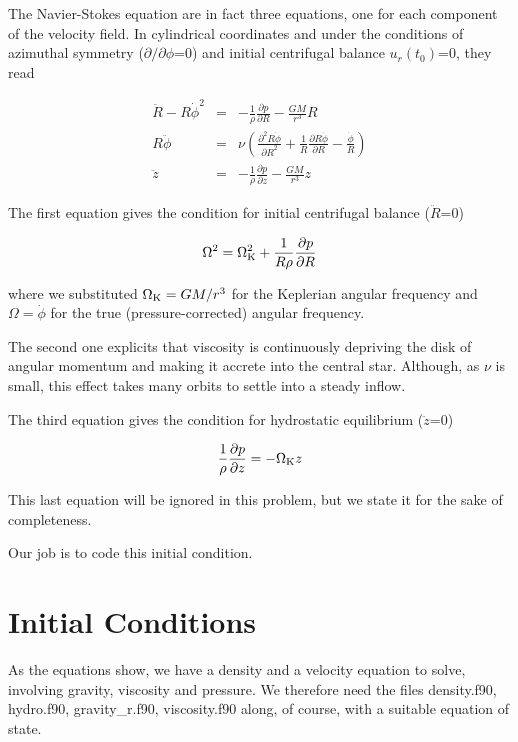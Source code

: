 \documentclass[a4paper,10pt]{article}
\newcommand{\pderiv}[2]{\frac{\partial #1}{\partial #2}}
\newcommand{\pderivn}[3]{\frac{{\partial{}}^{#3} #1}{{\partial #2}^{#3}}}
\begin{document}
The Navier-Stokes equation are in fact three equations, one for each component of the velocity field. In cylindrical coordinates and under the conditions of azimuthal symmetry ($\partial /{\partial}\phi$=0) and initial centrifugal balance $u_{r}(t_0)$=0, they read

\begin{eqnarray}
\ddot{R} - R{\dot{\phi}}^2 &=&  -\frac{1}{\rho}\pderiv{p}{R} - \frac{GM}{r^3}R\\ 
R\ddot{\phi}  &=&  \nu \left(\pderivn{R\dot\phi}{R}{2} + \frac{1}{R}\pderiv{R\dot{\phi}}{R} - \frac{\dot\phi}{R} \right)\\
\ddot{z}  &=& -\frac{1}{\rho}\pderiv{p}{z} - \frac{GM}{r^3}z 
\end{eqnarray}

The first equation gives the condition for initial centrifugal balance ($\ddot{R}$=0)

\begin{equation}
  \label{centrifugal}
  \Omega^2 = \Omega_{\rm K}^2 + \frac{1}{R\rho}\pderiv{p}{R} 
\end{equation}

\noindent where we substituted $\Omega_{\rm K}=GM/r^3$ for the Keplerian angular frequency and $\Omega=\dot\phi$ for the true (pressure-corrected) angular frequency.

The second one explicits that viscosity is continuously depriving the disk
of angular momentum and making it accrete into the central star.
Although, as $\nu$ is small, this effect takes many orbits to settle into a steady inflow. 

The third equation gives the condition for hydrostatic equilibrium ($\ddot{z}$=0)

\begin{equation}
  \frac{1}{\rho}\pderiv{p}{z} = -\Omega_{\rm K} z 
\end{equation}

This last equation will be ignored in this problem, but we state it for the sake of completeness. 

Our job is to code this initial condition.

\section{Initial Conditions}

As the equations show, we have a density and a velocity equation to
solve, involving gravity, viscosity and pressure. We therefore need
the files density.f90, hydro.f90, gravity\_r.f90, viscosity.f90 along,
of course, with a suitable equation of state. 
\end{document}
